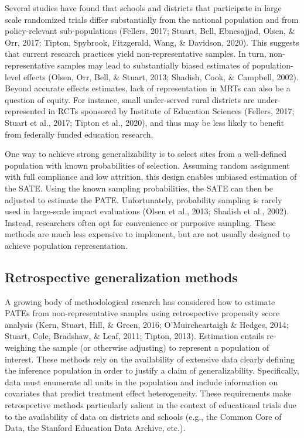 \documentclass[
  english,
  man,floatsintext]{apa6}
\begin{document}
Several studies have found that schools and districts that participate in large scale randomized trials differ substantially from the national population and from policy-relevant sub-populations (Fellers, 2017; Stuart, Bell, Ebnesajjad, Olsen, \& Orr, 2017; Tipton, Spybrook, Fitzgerald, Wang, \& Davidson, 2020). This suggests that current research practices yield non-representative samples. In turn, non-representative samples may lead to substantially biased estimates of population-level effects (Olsen, Orr, Bell, \& Stuart, 2013; Shadish, Cook, \& Campbell, 2002). Beyond accurate effects estimates, lack of representation in MRTs can also be a question of equity. For instance, small under-served rural districts are under-represented in RCTs sponsored by Institute of Education Sciences (Fellers, 2017; Stuart et al., 2017; Tipton et al., 2020), and thus may be less likely to benefit from federally funded education research.

One way to achieve strong generalizability is to select sites from a well-defined population with known probabilities of selection. Assuming random assignment with full compliance and low attrition, this design enables unbiased estimation of the SATE. Using the known sampling probabilities, the SATE can then be adjusted to estimate the PATE. Unfortunately, probability sampling is rarely used in large-scale impact evaluations (Olsen et al., 2013; Shadish et al., 2002). Instead, researchers often opt for convenience or purposive sampling. These methods are much less expensive to implement, but are not usually designed to achieve population representation.

\hypertarget{retrospective-generalization-methods}{%
\subsection{Retrospective generalization methods}\label{retrospective-generalization-methods}}

A growing body of methodological research has considered how to estimate PATEs from non-representative samples using retrospective propensity score analysis (Kern, Stuart, Hill, \& Green, 2016; O'Muircheartaigh \& Hedges, 2014; Stuart, Cole, Bradshaw, \& Leaf, 2011; Tipton, 2013). Estimation entails re-weighing the sample (or otherwise adjusting) to represent a population of interest.
These methods rely on the availability of extensive data clearly defining the inference population in order to justify a claim of generalizability. Specifically, data must enumerate all units in the population and include information on covariates that predict treatment effect heterogeneity. These requirements make retrospective methods particularly salient in the context of educational trials due to the availability of data on districts and schools (e.g., the Common Core of Data, the Stanford Education Data Archive, etc.).
\end{document}
